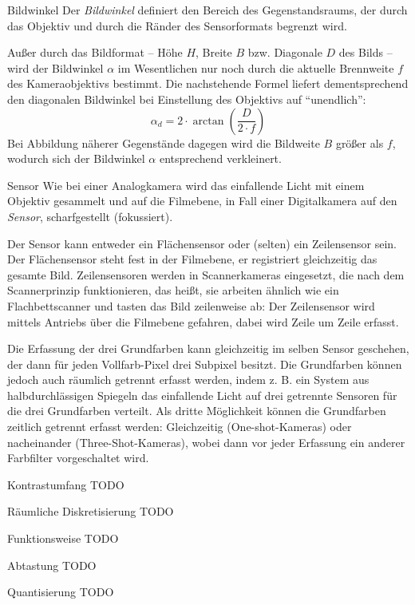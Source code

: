 \begin{defi}{Bildwinkel}
    Der \emph{Bildwinkel} definiert den Bereich des Gegenstandsraums, der durch das Objektiv und durch die Ränder des Sensorformats begrenzt wird.

    Außer durch das Bildformat -- Höhe $H$, Breite $B$ bzw. Diagonale $D$ des Bilds -- wird der Bildwinkel $\alpha$ im Wesentlichen nur noch durch die aktuelle Brennweite $f$ des Kameraobjektivs bestimmt.
    Die nachstehende Formel liefert dementsprechend den diagonalen Bildwinkel bei Einstellung des Objektivs auf \enquote{unendlich}:
    \[
        \alpha_d = 2 \cdot \arctan \left( \frac{D}{2 \cdot f} \right)
    \]
    Bei Abbildung näherer Gegenstände dagegen wird die Bildweite $B$ größer als $f$, wodurch sich der Bildwinkel $\alpha$ entsprechend verkleinert.

\end{defi}

\begin{defi}[Kamera]{Sensor}
    Wie bei einer Analogkamera wird das einfallende Licht mit einem Objektiv gesammelt und auf die Filmebene, in Fall einer Digitalkamera auf den \emph{Sensor}, scharfgestellt (fokussiert).

    Der Sensor kann entweder ein Flächensensor oder (selten) ein Zeilensensor sein. Der Flächensensor steht fest in der Filmebene, er registriert gleichzeitig das gesamte Bild. Zeilensensoren werden in Scannerkameras eingesetzt, die nach dem Scannerprinzip funktionieren, das heißt, sie arbeiten ähnlich wie ein Flachbettscanner und tasten das Bild zeilenweise ab: Der Zeilensensor wird mittels Antriebs über die Filmebene gefahren, dabei wird Zeile um Zeile erfasst.

    Die Erfassung der drei Grundfarben kann gleichzeitig im selben Sensor geschehen, der dann für jeden Vollfarb-Pixel drei Subpixel besitzt.
    Die Grundfarben können jedoch auch räumlich getrennt erfasst werden, indem z. B. ein System aus halbdurchlässigen Spiegeln das einfallende Licht auf drei getrennte Sensoren für die drei Grundfarben verteilt.
    Als dritte Möglichkeit können die Grundfarben zeitlich getrennt erfasst werden:
    Gleichzeitig (One-shot-Kameras) oder nacheinander (Three-Shot-Kameras), wobei dann vor jeder Erfassung ein anderer Farbfilter vorgeschaltet wird.
\end{defi}

\begin{defi}{Kontrastumfang}
    TODO
\end{defi}

\begin{bonus}{Räumliche Diskretisierung}
    TODO
\end{bonus}

\begin{bonus}{Funktionsweise}
    TODO
\end{bonus}

\begin{defi}{Abtastung}
    TODO
\end{defi}

\begin{defi}{Quantisierung}
    TODO
\end{defi}